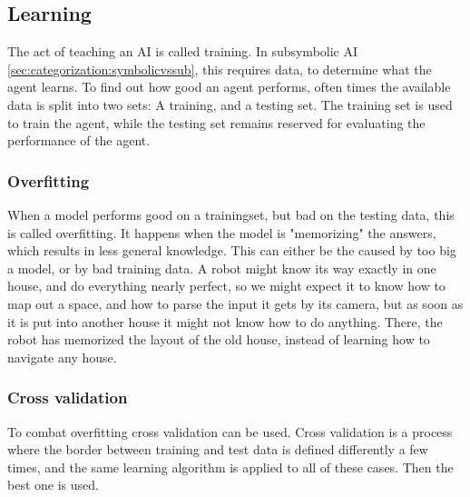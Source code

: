 \subsection{Learning}
The act of teaching an AI is called training. In subsymbolic AI \autoref{sec:categorization:symbolicvssub}, this requires data, to determine what the agent learns. To find out how good an agent performs, often times the available data is split into two sets: A training, and a testing set. The training set is used to train the agent, while the testing set remains reserved for evaluating the performance of the agent.

\subsubsection{Overfitting}
\label{sec:overfitting}
When a model performs good on a trainingset, but bad on the testing data, this is called overfitting. It happens when the model is "memorizing" the answers, which results in less general knowledge. This can either be the caused by too big a model, or by bad training data\cite{overfit}. A robot might know its way exactly in one house, and do everything nearly perfect, so we might expect it to know how to map out a space, and how to parse the input it gets by its camera, but as soon as it is put into another house it might not know how to do anything. There, the robot has memorized the layout of the old house, instead of learning how to navigate any house.

\subsubsection{Cross validation}
To combat overfitting cross validation can be used. Cross validation is a process where the border between training and test data is defined differently a few times, and the same learning algorithm is applied to all of these cases. Then the best one is used.